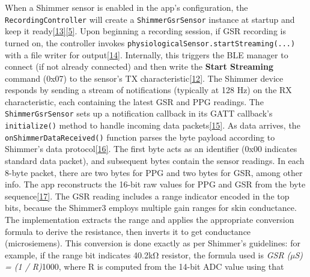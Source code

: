 \documentclass[12pt,a4paper]{article}
\begin{document}
When a Shimmer sensor is enabled in the app's configuration, the \passthrough{\lstinline!RecordingController!} will create a \passthrough{\lstinline!ShimmerGsrSensor!} instance at startup and keep it ready\href{https://github.com/buccancs/GSR-Dual-Video-System/blob/05ae360cb7b4ae7c7861f72deb235ad64a74b38e/android/app/src/main/java/com/yourcompany/gsrcapture/controller/RecordingController.kt\#L26-L34}{{[}13{]}}\href{https://github.com/buccancs/GSR-Dual-Video-System/blob/05ae360cb7b4ae7c7861f72deb235ad64a74b38e/android/app/src/main/java/com/yourcompany/gsrcapture/controller/RecordingController.kt\#L28-L32}{{[}5{]}}. Upon beginning a recording session, if GSR recording is turned on, the controller invokes \passthrough{\lstinline!physiologicalSensor.startStreaming(...)!} with a file writer for output\href{https://github.com/buccancs/GSR-Dual-Video-System/blob/05ae360cb7b4ae7c7861f72deb235ad64a74b38e/android/app/src/main/java/com/yourcompany/gsrcapture/controller/RecordingController.kt\#L39-L47}{{[}14{]}}. Internally, this triggers the BLE manager to connect (if not already connected) and then write the \textbf{Start Streaming} command (0x07) to the sensor's TX characteristic\href{https://github.com/buccancs/GSR-Dual-Video-System/blob/05ae360cb7b4ae7c7861f72deb235ad64a74b38e/android/app/src/main/java/com/yourcompany/gsrcapture/hardware/ShimmerGsrSensor.kt\#L52-L60}{{[}12{]}}. The Shimmer device responds by sending a stream of notifications (typically at 128 Hz) on the RX characteristic, each containing the latest GSR and PPG readings. The \passthrough{\lstinline!ShimmerGsrSensor!} sets up a notification callback in its GATT callback's \passthrough{\lstinline!initialize()!} method to handle incoming data packets\href{https://github.com/buccancs/GSR-Dual-Video-System/blob/05ae360cb7b4ae7c7861f72deb235ad64a74b38e/android/app/src/main/java/com/yourcompany/gsrcapture/hardware/ShimmerGsrSensor.kt\#L69-L77}{{[}15{]}}. As data arrives, the \passthrough{\lstinline!onShimmerDataReceived()!} function parses the byte payload according to Shimmer's data protocol\href{https://github.com/buccancs/GSR-Dual-Video-System/blob/05ae360cb7b4ae7c7861f72deb235ad64a74b38e/android/app/src/main/java/com/yourcompany/gsrcapture/hardware/ShimmerGsrSensor.kt\#L84-L92}{{[}16{]}}. The first byte acts as an identifier (0x00 indicates standard data packet), and subsequent bytes contain the sensor readings. In each 8-byte packet, there are two bytes for PPG and two bytes for GSR, among other info. The app reconstructs the 16-bit raw values for PPG and GSR from the byte sequence\href{https://github.com/buccancs/GSR-Dual-Video-System/blob/05ae360cb7b4ae7c7861f72deb235ad64a74b38e/android/app/src/main/java/com/yourcompany/gsrcapture/hardware/ShimmerGsrSensor.kt\#L86-L94}{{[}17{]}}. The GSR reading includes a range indicator encoded in the top bits, because the Shimmer3 employs multiple gain ranges for skin conductance. The implementation extracts the range and applies the appropriate conversion formula to derive the resistance, then inverts it to get conductance (microsiemens). This conversion is done exactly as per Shimmer's guidelines: for example, if the range bit indicates 40.2kΩ resistor, the formula used is \emph{GSR (µS) = (1 / R)}1000, where R is computed from the 14-bit ADC value using that 
\end{document}
